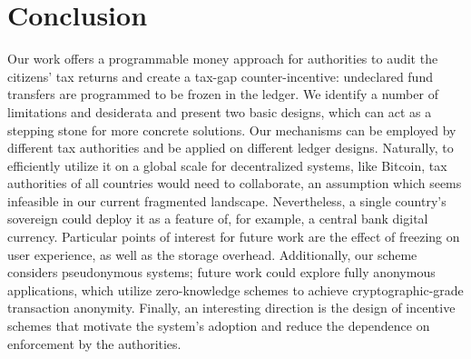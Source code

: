\section{Conclusion}\label{sec:conclusion}

Our work offers a programmable money
approach for authorities to audit the citizens' tax returns and create
a tax-gap counter-incentive: undeclared fund transfers are programmed to
be frozen in the ledger. We identify a number of limitations and
desiderata and present two basic designs, which can act as a stepping stone for
more concrete solutions. Our mechanisms can be employed by different tax
authorities and be applied on different ledger designs. Naturally, to
efficiently utilize it on a global scale for decentralized systems, like
Bitcoin, tax authorities of all countries would need to collaborate, an
assumption which seems infeasible in our current fragmented landscape.
Nevertheless, a single country's sovereign could deploy it as a feature of, for
example, a central bank digital currency.  Particular points of interest for
future work are the effect of freezing on user experience, as well as the
storage overhead. Additionally, our scheme considers pseudonymous systems;
future work could explore fully anonymous applications, which utilize
zero-knowledge schemes to achieve cryptographic-grade
transaction anonymity. Finally, an
interesting direction is the design of incentive schemes that motivate the
system's adoption and reduce the dependence on enforcement by the authorities.
